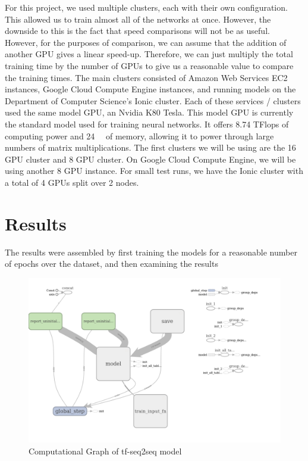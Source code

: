 \documentclass[pageno]{jpaper}
\begin{document}
\par
For this project, we used multiple clusters, each with their own configuration.  This allowed us to train almost all of the networks at once.  However, the downside to this is the fact that speed comparisons will not be as useful.  However, for the purposes of comparison, we can assume that the addition of another GPU gives a linear speed-up.  Therefore, we can just multiply the total training time by the number of GPUs to give us a reasonable value to compare the training times.  The main clusters consisted of Amazon Web Services EC2 instances, Google Cloud Compute Engine instances, and running models on the Department of Computer Science's Ionic cluster.  Each of these services / clusters used the same model GPU, an Nvidia K80 Tesla.  This model GPU is currently the standard model used for training neural networks.  It offers 8.74 TFlops of computing power and \SI{24}{\giga\byte} of memory, allowing it to power through large numbers of matrix multiplications.  The first clusters we will be using are the 16 GPU cluster and 8 GPU cluster.  On Google Cloud Compute Engine, we will be using another 8 GPU instance.  For small test runs, we have the Ionic cluster with a total of 4 GPUs split over 2 nodes.

\section{Results}
The results were assembled by first training the models for a reasonable number of epochs over the dataset, and then examining the results 

\begin{figure}[H]
	\centering
	\includegraphics[scale=0.35]{example_graph.png}
	\caption{Computational Graph of tf-seq2seq model}
	\label{fg:exgraph}
\end{figure}
\end{document}
